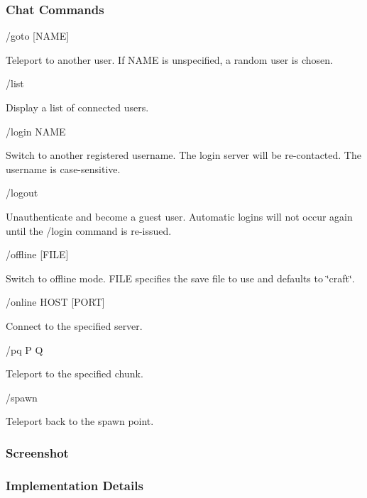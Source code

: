 \subsubsection*{Chat Commands}

\begin{DoxyVerb}/goto [NAME]
\end{DoxyVerb}


Teleport to another user. If N\+A\+ME is unspecified, a random user is chosen. \begin{DoxyVerb}/list
\end{DoxyVerb}


Display a list of connected users. \begin{DoxyVerb}/login NAME
\end{DoxyVerb}


Switch to another registered username. The login server will be re-\/contacted. The username is case-\/sensitive. \begin{DoxyVerb}/logout
\end{DoxyVerb}


Unauthenticate and become a guest user. Automatic logins will not occur again until the /login command is re-\/issued. \begin{DoxyVerb}/offline [FILE]
\end{DoxyVerb}


Switch to offline mode. F\+I\+LE specifies the save file to use and defaults to \char`\"{}craft\char`\"{}. \begin{DoxyVerb}/online HOST [PORT]
\end{DoxyVerb}


Connect to the specified server. \begin{DoxyVerb}/pq P Q
\end{DoxyVerb}


Teleport to the specified chunk. \begin{DoxyVerb}/spawn
\end{DoxyVerb}


Teleport back to the spawn point.

\subsubsection*{Screenshot}



\subsubsection*{Implementation Details}

